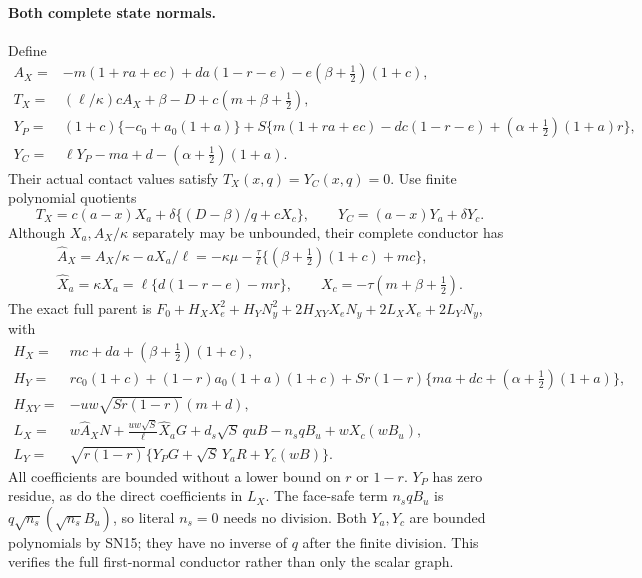 \paragraph{Both complete state normals.}
Define
\[
\begin{split}
 A_X={}&-m(1+ra+ec)+da(1-r-e)-e(\beta+\tfrac12)(1+c),\\
 T_X={}&(\ell/\kappa)cA_X+\beta-D+c(m+\beta+\tfrac12),\\
 Y_P={}&(1+c)\{-c_0+a_0(1+a)\}
 +S\{m(1+ra+ec)-dc(1-r-e)
                    +(\alpha+\tfrac12)(1+a)r\},\\
 Y_C={}&\ell Y_P-ma+d-(\alpha+\tfrac12)(1+a).
\end{split}\tag{SN15}
\]
Their actual contact values satisfy $T_X(x,q)=Y_C(x,q)=0$.
Use finite polynomial quotients
\[
 T_X=c(a-x)X_a+\delta\{(D-\beta)/q+cX_c\},\qquad
 Y_C=(a-x)Y_a+\delta Y_c.
 \tag{SN16}
\]
Although $X_a,A_X/\kappa$ separately may be unbounded, their
complete conductor has
\[
\begin{gathered}
 \widehat A_X=A_X/\kappa-aX_a/\ell
 =-\kappa\mu-\frac\tau\ell
                  \{(\beta+\tfrac12)(1+c)+mc\},\\
 \widehat X_a=\kappa X_a=\ell\{d(1-r-e)-mr\},\qquad
 X_c=-\tau(m+\beta+\tfrac12).
\end{gathered}\tag{SN17}
\]
The exact full parent is $F_0+H_XX_e^2+H_YN_y^2+
2H_{XY}X_eN_y+2L_XX_e+2L_YN_y$, with
\[
\begin{split}
 H_X={}&mc+da+(\beta+\tfrac12)(1+c),\\
 H_Y={}&rc_0(1+c)+(1-r)a_0(1+a)(1+c)
       +Sr(1-r)\{ma+dc+(\alpha+\tfrac12)(1+a)\},\\
 H_{XY}={}&-uw\sqrt{Sr(1-r)}(m+d),\\
 L_X={}&w\widehat A_XN+
        \frac{uw\sqrt S}{\ell}\widehat X_aG
        +d_s\sqrt S\,quB-n_sqB_u+wX_c(wB_u),\\
 L_Y={}&\sqrt{r(1-r)}\{Y_PG+\sqrt S\,Y_aR+Y_c(wB)\}.
\end{split}\tag{SN18}
\]
All coefficients are bounded without a lower bound on $r$ or $1-r$.
$Y_P$ has zero residue, as do the direct coefficients in $L_X$.
The face-safe term $n_sqB_u$ is $q\sqrt{n_s}(\sqrt{n_s}B_u)$,
so literal $n_s=0$ needs no division. Both $Y_a,Y_c$ are bounded
polynomials by SN15; they have no inverse of $q$ after the finite
division. This verifies the full first-normal conductor rather than
only the scalar graph.


